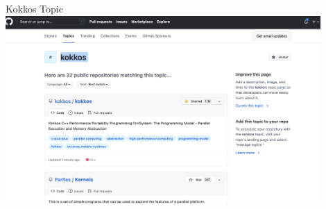 \begin{frame}[fragile]{Kokkos Topic}
  \includegraphics[width=0.9\textwidth]{3_7/kokkos-topic.png}
\end{frame}












